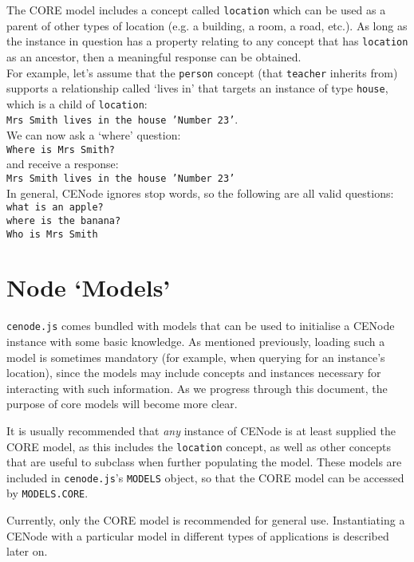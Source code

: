 \documentclass{article}
\begin{document}
The CORE model includes a concept called \texttt{location} which can be used as a parent of other types of location (e.g. a building, a room, a road, etc.). As long as the instance in question has a property relating to any concept that has \texttt{location} as an ancestor, then a meaningful response can be obtained.\\

For example, let's assume that the \texttt{person} concept (that \texttt{teacher} inherits from) supports a relationship called `lives in' that targets an instance of type \texttt{house}, which is a child of \texttt{location}:\\
\texttt{Mrs Smith lives in the house 'Number 23'}.\\

We can now ask a `where' question:\\
\texttt{Where is Mrs Smith?}\\
and receive a response:\\
\texttt{Mrs Smith lives in the house 'Number 23'}\\

In general, CENode ignores stop words, so the following are all valid questions:\\
\texttt{what is an apple?}\\
\texttt{where is the banana?}\\
\texttt{Who is Mrs Smith}


\section{Node `Models'}
\texttt{cenode.js} comes bundled with models that can be used to initialise a CENode instance with some basic knowledge. As mentioned previously, loading such a model is sometimes mandatory (for example, when querying for an instance's location), since the models may include concepts and instances necessary for interacting with such information. As we progress through this document, the purpose of core models will become more clear.

It is usually recommended that \textit{any} instance of CENode is at least supplied the CORE model, as this includes the \texttt{location} concept, as well as other concepts that are useful to subclass when further populating the model. These models are included in \texttt{cenode.js}'s \texttt{MODELS} object, so that the CORE model can be accessed by \texttt{MODELS.CORE}.

Currently, only the CORE model is recommended for general use. Instantiating a CENode with a particular model in different types of applications is described later on.
\end{document}
